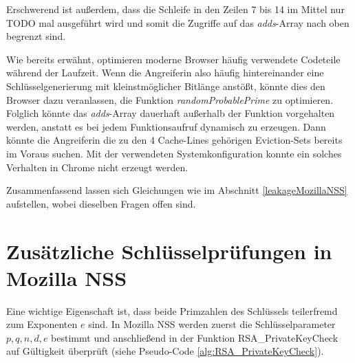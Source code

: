 Erschwerend ist außerdem, dass die Schleife in den Zeilen 7 bis 14 im Mittel nur TODO mal ausgeführt wird und somit die Zugriffe auf das \textit{adds}-Array nach oben begrenzt sind.

Wie bereits erwähnt, optimieren moderne Browser häufig verwendete Codeteile während der Laufzeit.
Wenn die Angreiferin also häufig hintereinander eine Schlüsselgenerierung mit kleinstmöglicher Bitlänge anstößt, könnte dies den Browser dazu veranlassen, die Funktion \textit{randomProbablePrime} zu optimieren. 
Folglich könnte das \textit{adds}-Array dauerhaft außerhalb der Funktion vorgehalten werden, anstatt es bei jedem Funktionsaufruf dynamisch zu erzeugen.
Dann könnte die Angreiferin die zu den 4 Cache-Lines gehörigen Eviction-Sets bereits im Voraus suchen.
Mit der verwendeten Systemkonfiguration konnte ein solches Verhalten in Chrome nicht erzeugt werden.

Zusammenfassend lassen sich Gleichungen wie im Abschnitt \ref{leakageMozillaNSS} aufstellen, wobei dieselben Fragen offen sind.






\section{Zusätzliche Schlüsselprüfungen in Mozilla NSS}
\label{RSAGenGCDAttack}

Eine wichtige Eigenschaft ist, dass beide Primzahlen des Schlüssels teilerfremd zum Exponenten $e$ sind.
In Mozilla NSS werden zuerst die Schlüsselparameter $p,q,n,d,e$ bestimmt und anschließend in der Funktion RSA_PrivateKeyCheck auf Gültigkeit überprüft (siehe Pseudo-Code \ref{alg:RSA_PrivateKeyCheck}).

